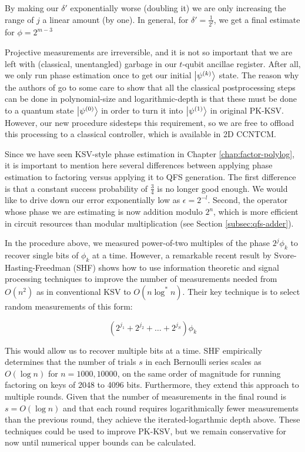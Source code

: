 By making our $\delta'$
exponentially worse (doubling it) we are only increasing the range of
$j$ a linear amount (by one). In general, for $\delta'=\frac{1}{2^l}$, we get
a final estimate for $\phi = 2^{m-3}$

Projective measurements are irreversible, and it is not so important that
we are left with (classical, unentangled) garbage in our $t$-qubit ancillae register.
After all, we only run phase estimation once
to get our initial $\left\vert{\psi^{(k)}}\right\rangle$ state.
The reason why
the authors of \cite{Kitaev2002} go to some care to show that all the classical
postprocessing steps can be done in polynomial-size and logarithmic-depth
is that these must be done to a quantum state $\left\vert{\psi^{(0)}}\right\rangle$ in order
to turn it into $\left\vert{\psi^{(1)}}\right\rangle$ in original PK-KSV. However, our new procedure
sidesteps this requirement, so we are free to offload this processing to a
classical controller, which is available in \textsf{2D CCNTCM}.

Since we have seen KSV-style phase estimation in
Chapter \ref{chap:factor-polylog}, it is important to mention here several
differences between applying phase estimation to factoring versus
applying it to QFS generation. The first difference is that a constant
success probability of $\frac{3}{4}$ is no longer good enough. We would
like to drive down our error exponentially low as $\epsilon = 2^{-l}$.
Second, the operator whose phase we are estimating is now
addition modulo $2^n$, which is more efficient in circuit resources
than modular multiplication (see Section \ref{subsec:qfs-adder}).

In the procedure above, we measured power-of-two multiples of the phase
$2^{j}\phi_k$ to recover single bits of $\phi_k$ at a time.
However, a remarkable recent result by Svore-Hasting-Freedman (SHF) shows
how to use information theoretic and signal processing techniques to
improve the number of measurements needed from $O(n^2)$ as in conventional
KSV to $O(n\log^{*}n)$.
Their key technique is to select random measurements of this form:

\begin{equation}
(2^{j_1}+2^{j_2}+\ldots + 2^{j_S})\phi_k
\end{equation}

This would allow us to recover multiple bits at a time.
SHF empirically determines that the number of trials $s$ in
each Bernoulli series scales as $O(\log n)$ for $n = {1000,10000}$,
on the same order of magnitude for running factoring on
keys of 2048 to 4096 bits.
Furthermore, they extend this approach to multiple rounds. Given
that the number of measurements in the final round is
$s = O(\log n)$ and that each round requires logarithmically
fewer measurements than the previous round, they
achieve the iterated-logarthmic depth above.
These techniques could be used to improve PK-KSV, but we
remain conservative for now until numerical upper bounds can be
calculated.

